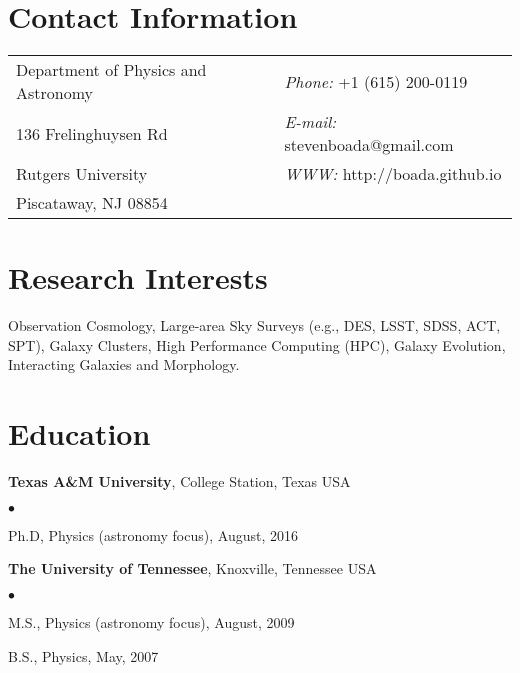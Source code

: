 \documentclass[margin,line, 11pt]{res}
\newenvironment{list2}{
  \begin{list}{$\bullet$}{%
      \setlength{\itemsep}{0in}
      \setlength{\parsep}{0in} \setlength{\parskip}{0in}
      \setlength{\topsep}{0in} \setlength{\partopsep}{0in}
      \setlength{\leftmargin}{0.2in}}}{\end{list}}
\begin{document}

\begin{resume}
\section{Contact Information}
\vspace{.05in}
\begin{tabular}{@{}p{3in}p{3in}}
Department of Physics and Astronomy & {\it Phone:}  +1 (615) 200-0119 \\
136 Frelinghuysen Rd   & {\it E-mail:}  stevenboada@gmail.com \\
Rutgers University & {\it WWW:} http://boada.github.io \\
Piscataway, NJ 08854  & \\
\end{tabular}

\section{Research Interests}
Observation Cosmology, Large-area Sky Surveys (e.g., DES, LSST, SDSS, ACT, SPT), Galaxy Clusters, High Performance Computing (HPC), Galaxy Evolution, Interacting Galaxies and Morphology.
\vspace*{-3mm}

\section{Education}
\textbf{Texas A\&M University}, College Station, Texas USA\\
\vspace*{-4mm}
\begin{list2}
	\item Ph.D, Physics (astronomy focus), August, 2016
\end{list2}
\vspace*{-4mm}

\textbf{The University of Tennessee}, Knoxville, Tennessee USA\\
\vspace*{-4mm}
\begin{list2}
	\item M.S., Physics (astronomy focus),  August, 2009
	\item B.S., Physics,  May, 2007
\end{list2}
\vspace*{-2.5mm}


\end{resume}
\end{document}
